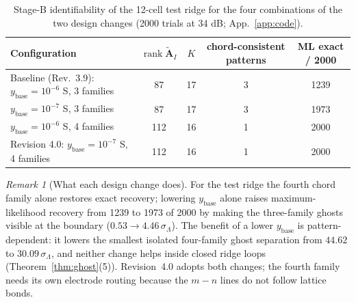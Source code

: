 \documentclass[11pt,a4paper]{article}
\theoremstyle{definition}
\theoremstyle{remark}
\newtheorem{remark}[theorem]{Remark}
\begin{document}
\begin{table}[h!]\centering\small
\begin{tabular}{@{}lcccc@{}}
\toprule
Configuration & $\operatorname{rank}\widetilde{\mathbf{A}}_I$ & $K$ & chord-consistent patterns & ML exact / 2000 \\
\midrule
Baseline (Rev.~3.9): $y_{\text{base}} = 10^{-6}$ S, 3 families & 87 & 17 & 3 & 1239 \\
$y_{\text{base}} = 10^{-7}$ S, 3 families & 87 & 17 & 3 & 1973 \\
$y_{\text{base}} = 10^{-6}$ S, 4 families & 112 & 16 & 1 & 2000 \\
Revision 4.0: $y_{\text{base}} = 10^{-7}$ S, 4 families & 112 & 16 & 1 & 2000 \\
\bottomrule
\end{tabular}
\caption{Stage-B identifiability of the 12-cell test ridge for the four combinations of the two design changes (2000 trials at 34 dB; App.~\ref{app:code}).}\label{tab:configs}
\end{table}

\begin{remark}[What each design change does]\label{rem:design}
For the test ridge the fourth chord family alone restores exact recovery; lowering $y_{\text{base}}$ alone raises maximum-likelihood recovery from 1239 to 1973 of 2000 by making the three-family ghosts visible at the boundary ($0.53\to4.46\,\sigma_\Lambda$). The benefit of a lower $y_{\text{base}}$ is pattern-dependent: it lowers the smallest isolated four-family ghost separation from $44.62$ to $30.09\,\sigma_\Lambda$, and neither change helps inside closed ridge loops (Theorem~\ref{thm:ghost}(5)). Revision~4.0 adopts both changes; the fourth family needs its own electrode routing because the $m-n$ lines do not follow lattice bonds.
\end{remark}
\end{document}

